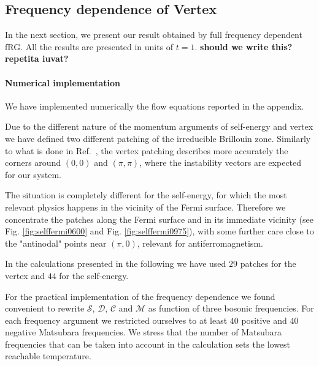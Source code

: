 \subsection{Frequency dependence of Vertex}


In the next section, we present our result obtained by full frequency dependent fRG. All the results are presented in units of $t=1$.  \textbf{should we write this? repetita iuvat?} 

\paragraph*{Numerical implementation}
We have implemented numerically the flow equations reported in the appendix. 

Due to the different nature of the momentum arguments of self-energy and vertex we have defined two different patching of the irreducible Brillouin zone. 
Similarly to what is done in Ref.~, the vertex patching describes more accurately the corners around $(0,0)$ and $(\pi,\pi)$, where the instability vectors are expected for our system.

The situation is completely different for the self-energy, for which the most relevant physics happens in the vicinity of the Fermi surface.
Therefore we concentrate the patches along the Fermi surface and in its immediate vicinity (see Fig. \ref{fig:selffermi0600} and Fig. \ref{fig:selffermi0975}), with some further care close to the "antinodal" points near $(\pi,0)$, relevant for antiferromagnetism.

In the calculations presented in the following we have used $29$ patches for the vertex and $44$ for the self-energy.

For the practical implementation of the frequency dependence we found convenient to rewrite $\mathcal{S}$, $\mathcal{D}$, $\mathcal{C}$ and $\mathcal{M}$ as function of three bosonic frequencies. 
For each frequency argument we restricted ourselves to at least $40$ positive and $40$ negative Matsubara frequencies. 
We stress that the number of Matsubara frequencies that can be taken into account in the calculation sets the lowest reachable temperature.


